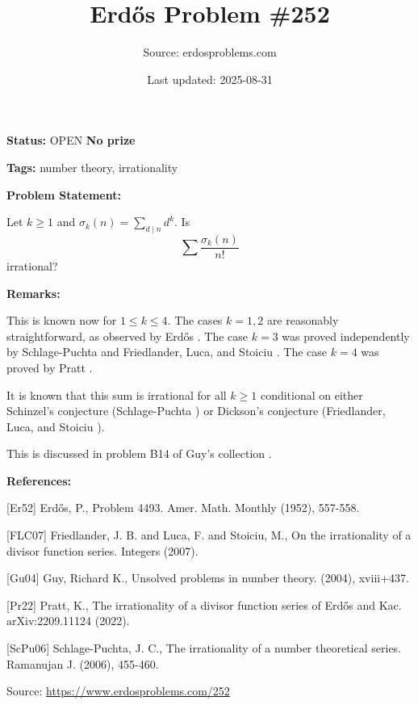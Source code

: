 \documentclass{article}
\title{Erd\H{o}s Problem \#252}
\date{Last updated: 2025-08-31}
\author{Source: erdosproblems.com}
\begin{document}
\maketitle

\noindent\textbf{Status:} OPEN \quad \textbf{No prize}

\noindent\textbf{Tags:} number theory, irrationality

\medskip
\noindent\textbf{Problem Statement:}

Let $k\geq 1$ and $\sigma_k(n)=\sum_{d\mid n}d^k$. Is\[\sum \frac{\sigma_k(n)}{n!}\]irrational?

\bigskip
\noindent\textbf{Remarks:}

This is known now for $1\leq k\leq 4$. The cases $k=1,2$ are reasonably straightforward, as observed by Erd\H{o}s \cite{Er52}. The case $k=3$ was proved independently by Schlage-Puchta \cite{ScPu06} and Friedlander, Luca, and Stoiciu \cite{FLC07}. The case $k=4$ was proved by Pratt \cite{Pr22}. 

It is known that this sum is irrational for all $k\geq 1$ conditional on either Schinzel's conjecture (Schlage-Puchta \cite{ScPu06}) or Dickson's conjecture (Friedlander, Luca, and Stoiciu \cite{FLC07}).

This is discussed in problem B14 of Guy's collection \cite{Gu04}.

\bigskip
\noindent\textbf{References:}

[Er52] Erd\H{o}s, P., Problem 4493. Amer. Math. Monthly (1952), 557-558.
 
 [FLC07] Friedlander, J. B. and Luca, F. and Stoiciu, M., On the irrationality of a divisor function series. Integers (2007).
 
 [Gu04] Guy, Richard K., Unsolved problems in number theory. (2004), xviii+437.
 
 [Pr22] Pratt, K., The irrationality of a divisor function series of Erd\H{o}s and Kac. arXiv:2209.11124 (2022).
 
 [ScPu06] Schlage-Puchta, J. C., The irrationality of a number theoretical series. Ramanujan J. (2006), 455-460.

\bigskip
\noindent\small{Source: \url{https://www.erdosproblems.com/252}}
\end{document}
